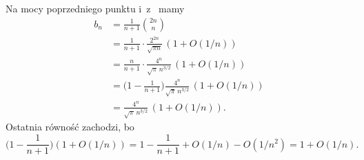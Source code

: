\subproblem %
Na mocy poprzedniego punktu i~z~ mamy
\begin{align*}
	b_n &= \frac{1}{n+1}\binom{2n}{n} \\
	&= \frac{1}{n+1}\cdot\frac{2^{2n}}{\sqrt{\pi n}}\,(1+O(1/n)) \\
	&= \frac{n}{n+1}\cdot\frac{4^n}{\sqrt{\pi}\,n^{3/2}}\,(1+O(1/n)) \\
	&= \biggl(1-\frac{1}{n+1}\biggr)\frac{4^n}{\sqrt{\pi}\,n^{3/2}}\,(1+O(1/n)) \\
	&= \frac{4^n}{\sqrt{\pi}\,n^{3/2}}\,(1+O(1/n)).
\end{align*}
Ostatnia równość zachodzi, bo
\[
	\biggl(1-\frac{1}{n+1}\biggr)(1+O(1/n)) = 1-\frac{1}{n+1}+O(1/n)-O(1/n^2) = 1+O(1/n).
\]

\endinput

